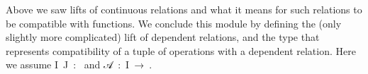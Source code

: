 Above we saw lifts of continuous relations and what it means for such relations to be compatible with functions. We conclude this module by defining the (only slightly more complicated) lift of dependent relations, and the type that represents compatibility of a tuple of operations with a dependent relation. Here we assume \ab I~\ab J~\as :~
and \ab 𝒜~\as :~\ab I~\as →~.
\ccpad
\begin{code}%
\>[0][@{}l@{\AgdaIndent{0}}]%
\>[1]\AgdaSpace{}%
\AgdaSymbol{:}\AgdaSpace{}%
\AgdaSpace{}%
\AgdaSpace{}%
\AgdaSpace{}%
\AgdaSpace{}%
\AgdaSpace{}%
\AgdaSpace{}%
\AgdaSpace{}%
\AgdaSpace{}%
\AgdaSymbol{(}\AgdaSpace{}%
\AgdaSpace{}%
\AgdaSpace{}%
\AgdaSymbol{))}\AgdaSpace{}%
\AgdaSpace{}%
\AgdaSpace{}%
\AgdaSpace{}%
\AgdaSpace{}%
\<%
\\
%
\>[1]\AgdaSpace{}%
\AgdaSpace{}%
\AgdaSpace{}%
\AgdaSymbol{=}\AgdaSpace{}%
\AgdaSpace{}%
\AgdaSpace{}%
\AgdaSpace{}%
\AgdaSpace{}%
\AgdaSpace{}%
\AgdaSpace{}%
\AgdaSpace{}%
\AgdaSymbol{(}\AgdaSpace{}%
\AgdaSymbol{)}\AgdaSpace{}%
\AgdaSymbol{)}\<%
\\
%
\\[\AgdaEmptyExtraSkip]%
%
\>[1]\AgdaSpace{}%
\AgdaSymbol{:}\AgdaSpace{}%
\AgdaSpace{}%
\AgdaSpace{}%
\AgdaSpace{}%

\end{code}
